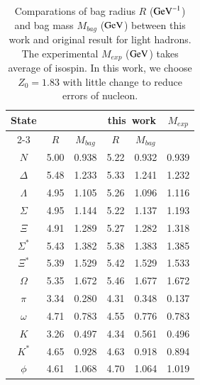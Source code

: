\documentclass[prd,twocolumn,floatfix,nofootinbib]{revtex4}
\begin{document}
\renewcommand{\tabcolsep}{0.39cm}
\renewcommand{\arraystretch}{1.3}
\begin{table}[!htbp]
    \caption{Comparations of bag radius $R$ (${\rm GeV}^{-1}$) and bag mass $M_{bag}$ (${\rm GeV}$) between this work and original result for light hadrons.
    The experimental $M_{exp}$ (${\rm GeV}$) takes average of isospin.
    In this work, we choose $Z_{0}=1.83$ with little change to reduce errors of nucleon.}
    \label{tab:lighthadron}
    \begin{tabular}{cccccc}
        \hline\hline
        \multirow{2}{*}{State} & \multicolumn{2}{c}{\cite{Johnson:1975zp}} & \multicolumn{2}{c}{\rm this\ work} & \multirow{2}{*}{$M_{exp}$} \\
        \cline{2-3} \cline{4-5}
        & $R$ & $M_{bag}$ & $R$ & $M_{bag}$ \\ \hline
        $N$               &5.00      &0.938      &5.22      &0.932      &0.939  \\
        $\Delta$          &5.48      &1.233      &5.33      &1.241      &1.232  \\
        $\Lambda$         &4.95      &1.105      &5.26      &1.096      &1.116  \\
        $\Sigma$          &4.95      &1.144      &5.22      &1.137      &1.193  \\
        $\Xi$             &4.91      &1.289      &5.27      &1.282      &1.318  \\
        $\Sigma^{\ast}$   &5.43      &1.382      &5.38      &1.383      &1.385  \\
        $\Xi^{\ast}$      &5.39      &1.529      &5.42      &1.529      &1.533  \\
        $\Omega$          &5.35      &1.672      &5.46      &1.677      &1.672  \\
        $\pi$             &3.34      &0.280      &4.31      &0.348      &0.137  \\
        $\omega$          &4.71      &0.783      &4.55      &0.776      &0.783  \\
        $K$               &3.26      &0.497      &4.34      &0.561      &0.496  \\
        $K^{\ast}$        &4.65      &0.928      &4.63      &0.918      &0.894  \\
        $\phi$            &4.61      &1.068      &4.70      &1.064      &1.019  \\
        \hline\hline
    \end{tabular}
\end{table}
\end{document}
